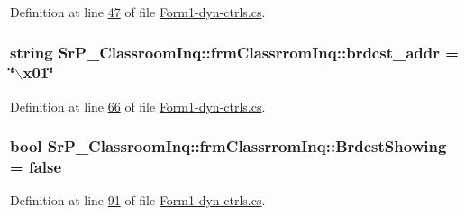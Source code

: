 \-Definition at line \hyperlink{_form1-dyn-ctrls_8cs_source_l00047}{47} of file \hyperlink{_form1-dyn-ctrls_8cs_source}{\-Form1-\/dyn-\/ctrls.\-cs}.

\hypertarget{class_sr_p___classroom_inq_1_1frm_classrrom_inq_a1d96e40e37aca536a94b7107df4a2d71}{
\subsubsection[{brdcst\-\_\-addr}]{\setlength{\rightskip}{0pt plus 5cm}string {\bf \-Sr\-P\-\_\-\-Classroom\-Inq\-::frm\-Classrrom\-Inq\-::brdcst\-\_\-addr} = \char`\"{}$\backslash$x01\char`\"{}}}
\label{class_sr_p___classroom_inq_1_1frm_classrrom_inq_a1d96e40e37aca536a94b7107df4a2d71}


\-Definition at line \hyperlink{_form1-dyn-ctrls_8cs_source_l00066}{66} of file \hyperlink{_form1-dyn-ctrls_8cs_source}{\-Form1-\/dyn-\/ctrls.\-cs}.

\hypertarget{class_sr_p___classroom_inq_1_1frm_classrrom_inq_a03327a44c502ac413d982a79dce5483c}{
\subsubsection[{\-Brdcst\-Showing}]{\setlength{\rightskip}{0pt plus 5cm}bool {\bf \-Sr\-P\-\_\-\-Classroom\-Inq\-::frm\-Classrrom\-Inq\-::\-Brdcst\-Showing} = false}}
\label{class_sr_p___classroom_inq_1_1frm_classrrom_inq_a03327a44c502ac413d982a79dce5483c}


\-Definition at line \hyperlink{_form1-dyn-ctrls_8cs_source_l00091}{91} of file \hyperlink{_form1-dyn-ctrls_8cs_source}{\-Form1-\/dyn-\/ctrls.\-cs}.

